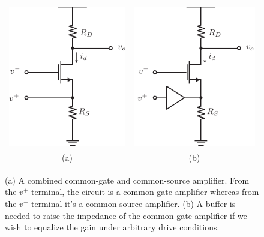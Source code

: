 \begin{figure}[tb]
\begin{center}
\begin{tabular}{cc}
\includegraphics[scale=1]{amp_diff_CS_CG.pdf} &
\includegraphics[scale=1]{amp_diff_CS_CG_buffer.pdf} \\
(a) & (b) \\
\end{tabular}
\end{center}
\caption{(a) A combined common-gate and common-source amplifier.  From the $v^+$ terminal, the circuit is a common-gate amplifier whereas from the $v^-$ terminal it's a common source amplifier.  (b) A buffer is needed to raise the impedance of the common-gate amplifier if we wish to equalize the gain under arbitrary drive conditions.}
\label{fig:amp_diff_CS_CG.pdf}
\end{figure}
